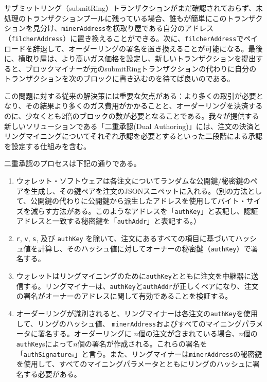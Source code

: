 \documentclass{article}
\begin{document}
\begin{multicols}{2}
サブミットリング（submitRing）トランザクションがまだ確認されておらず、未処理のトランザクションプールに残っている場合、誰もが簡単にこのトランザクションを見分け、\verb|minerAddress|を横取り屋である自分のアドレス（\verb|filcherAddress|）に置き換えることができる。次に、\verb|filcherAddress|でペイロードを辞退して、オーダーリングの署名を置き換えることが可能になる。最後に、横取り屋は、より高いガス価格を設定し、新しいトランザクションを提出すると、ブロックマイナーが元のsubmitRingトランザクションの代わりに自分のトランザクションを次のブロックに書き込むのを待てば良いのである。

この問題に対する従来の解決策には重要な欠点がある：より多くの取引が必要となり、その結果より多くのガス費用がかかることと、オーダーリングを決済するのに、少なくとも2倍のブロックの数が必要となることである。我々が提供する新しいソリューションである「二重承認(Dual Authoring)」\cite{dualauthor}には、注文の決済とリングマイニングについてそれぞれ承認を必要とするといった二段階による承認を設定する仕組みを含む。


二重承認のプロセスは下記の通りである。

\begin{enumerate}

	\item ウォレット・ソフトウェアは各注文についてランダムな公開鍵/秘密鍵のペアを生成し、その鍵ペアを注文のJSONスニペットに入れる。（別の方法として、公開鍵の代わりに公開鍵から派生したアドレスを使用してバイト・サイズを減らす方法がある。このようなアドレスを「\verb|authKey|」と表記し、認証アドレスと一致する秘密鍵を「\verb|authAddr|」と表記する。）


	\item \verb|r|, \verb|v|, \verb|s|, 及び \verb|authKey| を除いて、注文にあるすべての項目に基づいてハッシュ値を計算し、そのハッシュ値に対してオーナーの秘密鍵（\verb|authKey|）で署名する。

	\item ウォレットはリングマイニングのために\verb|authKey|とともに注文を中継器に送信する。リングマイナーは、\verb|authKey|と\verb|authAddr|が正しくペアになり、注文の署名がオーナーのアドレスに関して有効であることを検証する。

	\item オーダーリングが識別されると、リングマイナーは各注文の\verb|authKey|を使用して、リングのハッシュ値、 \verb|minerAddress|およびすべてのマイニングパラメータに署名する。オーダーリングに $n$個の注文が含まれている場合、$n$個の\verb|authKey|sによって$n$個の署名が作成される。これらの署名を「\verb|authSignature|s」と言う。また、リングマイナーは\verb|minerAddress|の秘密鍵を使用して、すべてのマイニングパラメータとともにリングのハッシュに署名する必要がある。


\end{enumerate}
\end{multicols}
\end{document}
